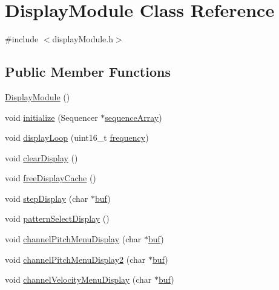 \hypertarget{class_display_module}{}\section{Display\+Module Class Reference}
\label{class_display_module}


{\ttfamily \#include $<$display\+Module.\+h$>$}

\subsection*{Public Member Functions}
\begin{DoxyCompactItemize}
\item 
\hyperlink{class_display_module_a6e39f0daba38d7d919ebece3e85c24b1}{Display\+Module} ()
\item 
void \hyperlink{class_display_module_a68451c130f98f5d820377e9aa15a7242}{initialize} (Sequencer $\ast$\hyperlink{class_display_module_a9eb0f63acb02bc366bdc36cf60efb799}{sequence\+Array})
\item 
void \hyperlink{class_display_module_ab89f4bb8387cd4a0557b23ee14133568}{display\+Loop} (uint16\+\_\+t \hyperlink{global_8h_acdfc8898c9e67fbcec81f3b04ae61bd9}{frequency})
\item 
void \hyperlink{class_display_module_a1e2ecbe240db8c38bea2839a76c566f0}{clear\+Display} ()
\item 
void \hyperlink{class_display_module_a4eb1fdb54d5ce4e0b8e460d30b443aac}{free\+Display\+Cache} ()
\item 
void \hyperlink{class_display_module_ac1d55595826fc36738b2d9df6be9516e}{step\+Display} (char $\ast$\hyperlink{class_display_module_a07c140067fde1f0cbc4061296179d69a}{buf})
\item 
void \hyperlink{class_display_module_a95fa96a6b2d74b8d15eeb0c71786b1b2}{pattern\+Select\+Display} ()
\item 
void \hyperlink{class_display_module_a61c9ecea836833a5460f2834a18eef05}{channel\+Pitch\+Menu\+Display} (char $\ast$\hyperlink{class_display_module_a07c140067fde1f0cbc4061296179d69a}{buf})
\item 
void \hyperlink{class_display_module_a5e665571a41c10190dd2015489f87f3e}{channel\+Pitch\+Menu\+Display2} (char $\ast$\hyperlink{class_display_module_a07c140067fde1f0cbc4061296179d69a}{buf})
\item 
void \hyperlink{class_display_module_afb4cbf31bb1058fdeceb3d10ae7fe3a6}{channel\+Velocity\+Menu\+Display} (char $\ast$\hyperlink{class_display_module_a07c140067fde1f0cbc4061296179d69a}{buf})

\end{DoxyCompactItemize}
